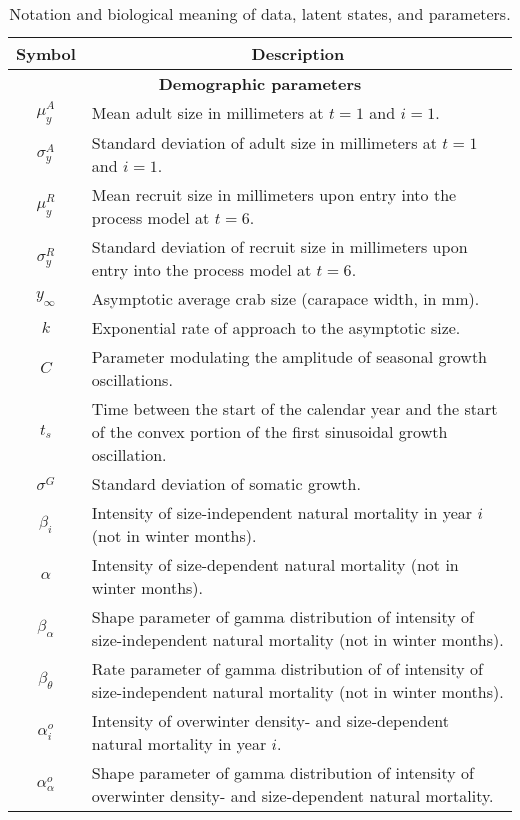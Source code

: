 \documentclass{article}
\begin{document}
\begin{longtable}{||c p{11cm}||} 
\caption{Notation and biological meaning of data, latent states, and parameters.}
 \hline
 \multicolumn{1}{||c|}{Symbol}  & \multicolumn{1}{c||}{Description} \\ [0.5ex] 
 \hline\hline
 \multicolumn{2}{||c||}{\textbf{Demographic parameters}} \\ 
 \hline
 $\mu^A_{y}$ & Mean adult size in millimeters at $t=1$ and $i=1$. \\ 
 \hline
 $\sigma^A_{y}$ & Standard deviation of adult size in millimeters at $t=1$ and $i=1$. \\ 
 \hline
 $\mu^R_{y}$ & Mean recruit size in millimeters upon entry into the process model at $t=6$. \\ 
 \hline
 $\sigma^R_{y}$ & Standard deviation of recruit size in millimeters upon entry into the process model at $t=6$. \\ 
 \hline
 $y_{\infty}$ & Asymptotic average crab size (carapace width, in mm). \\ 
 \hline
 $k$ & Exponential rate of approach to the asymptotic size. \\ 
 \hline
 $C$ & Parameter modulating the amplitude of seasonal growth oscillations. \\ 
 \hline
 $t_s$ & Time between the start of the calendar year and the start of the convex portion of the first sinusoidal growth oscillation. \\ 
 \hline
 $\sigma^G$ & Standard deviation of somatic growth. \\ 
 \hline
 $\beta_i$ & Intensity of size-independent natural mortality in year $i$ (not in winter months). \\ 
 \hline
 $\alpha$ & Intensity of size-dependent natural mortality (not in winter months). \\ 
 \hline
 $\beta_{\alpha}$ & Shape parameter of gamma distribution of intensity of size-independent natural mortality (not in winter months). \\ 
 \hline
 $\beta_{\theta}$ & Rate parameter of gamma distribution of of intensity of size-independent natural mortality (not in winter months). \\ 
 \hline
 $\alpha^o_i$ & Intensity of overwinter density- and size-dependent natural mortality in year $i$. \\ 
 \hline
 $\alpha^o_{\alpha}$ & Shape parameter of gamma distribution of intensity of overwinter density- and size-dependent natural mortality. \\ 

\end{longtable}
\end{document}
